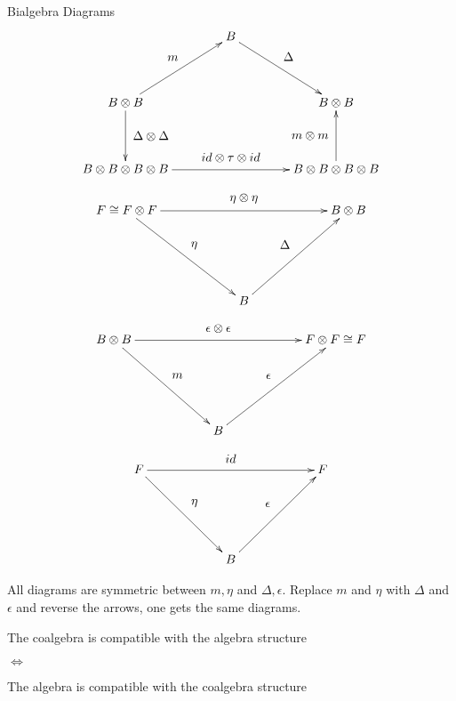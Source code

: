 \documentclass[pdf,colorBG,slideColor,fyma]{prosper}
\begin{document}
 {
\begin{slide}{Bialgebra Diagrams}
{
    \[
    \xymatrix@=40pt{
                                                                    & B  \ar[dr]^-*+{\Delta} & \\
        B \otimes B \ar[ur]^-*+{m} \ar[d]^-*+{\Delta \otimes \Delta}            &  & B \otimes B \\
        B \otimes B \otimes B \otimes B \ar[rr]^-*+{id \otimes \tau \otimes id} &  & B \otimes B \otimes B \otimes B \ar[u]^-*+{m \otimes m}\\
    }
    \]
}
{
  \[
  \xymatrix@=60pt{
    F \cong F \otimes F \ar[dr]^-*+{\eta} \ar[rr]^-*+{\eta \otimes \eta} &                       & B \otimes B\\
                                                                         & B \ar[ur]^-*+{\Delta} &            \\
  }
  \]
}
{
  \[
  \xymatrix@=60pt{
    B \otimes B \ar[dr]^-*+{m} \ar[rr]^-*+{\epsilon \otimes \epsilon} &                         & F \otimes F \cong F \\
                                                                      & B \ar[ur]^-*+{\epsilon} &                     \\
  }
  \]
}
{
  \[
  \xymatrix@=60pt{
    F \ar[dr]^-*+{\eta} \ar[rr]^-*+{id} &                         & F  \\
                                        & B \ar[ur]^-*+{\epsilon} & \\
  }
  \]
}
{
All diagrams are symmetric between $m, \eta$ and $\Delta, \epsilon$.
\break
\break
Replace $m$ and $\eta$ with $\Delta$ and $\epsilon$ and reverse the arrows, one
gets the same diagrams.
\break
\break
\begin{minipage}{130pt}
The coalgebra is \break compatible with the \break algebra structure
\end{minipage}
\hspace{10pt}
$\Leftrightarrow$
\hspace{10pt}
\begin{minipage}{130pt}
The algebra is \break compatible with the \break coalgebra structure
\end{minipage}
}
\end{slide}
}
\end{document}
